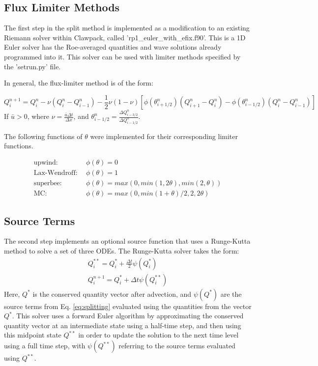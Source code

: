 \documentclass{article}%
\numberwithin{equation}{section}
\begin{document}
\subsection{Flux Limiter Methods}
The first step in the split method is implemented as a modification to an existing Riemann solver within Clawpack, called 'rp1\_euler\_with\_efix.f90'. This is a 1D Euler solver has the Roe-averaged quantities and wave solutions already programmed into it. This solver can be used with limiter methods specified by the 'setrun.py' file.

In general, the flux-limiter method is of the form:

\begin{equation}
Q^{n+1}_i=Q^n_i-\nu(Q^n_i-Q^n_{i-1})-\frac{1}{2}\nu(1-\nu)[\phi(\theta^n_{i+1/2})(Q^n_{i+1}-Q^n_i)-\phi(\theta^n_{i-1/2})(Q^n_{i}-Q^n_{i-1})]
\end{equation}
If $ \bar{u} > 0 $, where $ \nu=\frac{\bar{u}\Delta t}{\Delta x} $, and $ \theta^n_{i-1/2}=\frac{\Delta Q^n_{i-3/2}}{\Delta Q^n_{i-1/2}} $.

The following functions of $ \theta $ were implemented for their corresponding limiter functions.

\begin{align}
\text{upwind:} \ \ & \phi(\theta)=0 \\
\text{Lax-Wendroff:} \ \ & \phi(\theta)=1 \\
\text{superbee:} \ \ & \phi(\theta)=max(0,min(1,2\theta), min(2,\theta)) \\
\text{MC:} \ \ & \phi(\theta)=max(0,min(1+\theta)/2,2, 2\theta)
\end{align}

\subsection{Source Terms}
The second step implements an optional source function that uses a Runge-Kutta method to solve a set of three ODEs. The Runge-Kutta solver takes the form:
\begin{equation}
\begin{split}
Q^{**}_i=Q^*_i+\frac{\Delta t}{2} \psi (Q^*_i) \\
Q^{n+1}_i=Q^*_i+ \Delta t \psi(Q^{**}_i)
\end{split}
\end{equation}
Here, $ Q^* $ is the conserved quantity vector after advection, and $ \psi(Q^*) $ are the source terms from Eq. \ref{eq:splitting} evaluated using the quantities from the vector $ Q^* $. This solver uses a forward Euler algorithm by approximating the conserved quantity vector at an intermediate state using a half-time step, and then using this midpoint state $ Q^{**} $ in order to update the solution to the next time level using a full time step, with $ \psi(Q^{**}) $ referring to the source terms evaluated using $ Q^{**} $.
\end{document}
